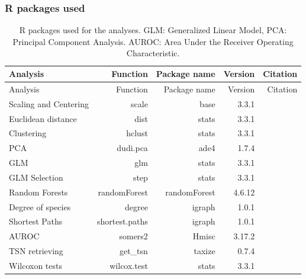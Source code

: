 \begin{landscape}

\subsubsection{R packages used}\label{r-packages-used}

\begin{longtable}[]{@{}lrrrr@{}}
\caption[R packages used for the analyse]{R packages used for the analyses. GLM: Generalized Linear
Model, PCA: Principal Component Analysis. AUROC: Area Under the Receiver
Operating Characteristic. \label{tbl:rpkges}}\tabularnewline
\toprule
Analysis & Function & Package name & Version & Citation\tabularnewline
\midrule
\endfirsthead
\toprule
Analysis & Function & Package name & Version & Citation\tabularnewline
\midrule
\endhead
Scaling and Centering & scale & base & 3.3.1 &
\citet{Rcoreteam2015}\tabularnewline
Euclidean distance & dist & stats & 3.3.1 &
\citet{Rcoreteam2015}\tabularnewline
Clustering & hclust & stats & 3.3.1 &
\citet{Rcoreteam2015}\tabularnewline
PCA & dudi.pca & ade4 & 1.7.4 & \citet{Dray2007}\tabularnewline
GLM & glm & stats & 3.3.1 & \citet{Rcoreteam2015}\tabularnewline
GLM Selection & step & stats & 3.3.1 &
\citet{Rcoreteam2015}\tabularnewline
Random Forests & randomForest & randomForest & 4.6.12 &
\citet{Liaw2002}\tabularnewline
Degree of species & degree & igraph & 1.0.1 &
\citet{Csardi2006}\tabularnewline
Shortest Paths & shortest.paths & igraph & 1.0.1 &
\citet{Csardi2006}\tabularnewline
AUROC & somers2 & Hmisc & 3.17.2 & \citet{HarrellJr2016}\tabularnewline
TSN retrieving & get\_tsn & taxize & 0.7.4 &
\citet{Chamberlain2013}\tabularnewline
Wilcoxon tests & wilcox.test & stats & 3.3.1 &
\citet{Rcoreteam2015}\tabularnewline
\bottomrule
\end{longtable}

\end{landscape}


\newpage


